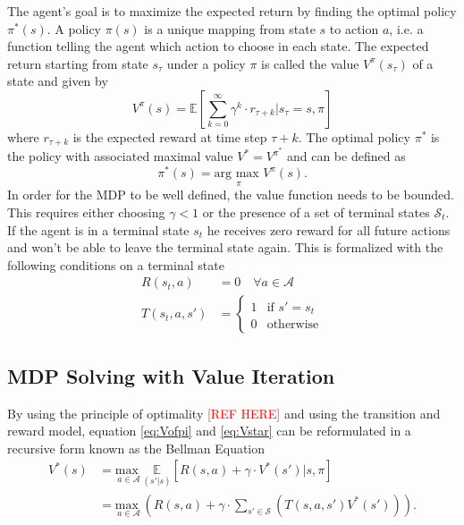 The agent's goal is to maximize the expected return by finding the optimal policy $\pi^*(s)$. A policy $\pi(s)$ is a unique mapping from state $s$ to action $a$, i.e. a function telling the agent which action to choose in each state. The expected return starting from state $s_\tau$ under a policy $\pi$ is called the value $V^\pi(s_\tau)$ of a state and given by 
\begin{equation}\label{eq:Vofpi}
    V^\pi(s) = \mathbb{E}\left[\sum_{k=0}^\infty \gamma^k\cdot r_{\tau+k}|s_\tau=s, \pi\right]
\end{equation}
where $r_{\tau+k}$ is the expected reward at time step $\tau+k$. 
The optimal policy $\pi^*$ is the policy with associated maximal value $V^*=V^{\pi^*}$ and can be defined as
\begin{equation}\label{eq:Vstar}
    \pi^*(s)=\underset{\pi}{\text{arg max }}V^\pi(s).
\end{equation}
In order for the MDP to be well defined, the value function needs to be bounded. This requires either choosing $\gamma<1$ or the presence of a set of terminal states $\mathcal{S}_t$. If the agent is in a terminal state $s_t$ he receives zero reward for all future actions and won't be able to leave the terminal state again. This is formalized with the following conditions on a terminal state
\begin{align}
    R(s_t, a) &= 0 \quad \forall a\in\mathcal{A}\\
    T(s_t, a, s') &=  \begin{cases}1 & \text{if }s'=s_t\\0 & \text{otherwise}\end{cases}
\end{align}

    




\subsection{MDP Solving with Value Iteration}\label{subsec:VALUEIT}

By using the principle of optimality \textcolor{red}{[REF HERE]} and using the transition and reward model, equation \ref{eq:Vofpi} and \ref{eq:Vstar} can be reformulated in a recursive form known as the Bellman Equation
\begin{align}\label{eq:BE}
    V^*(s) &= \underset{a\in\mathcal{A}}{\text{max }} \underset{(s'|s)}{\mathbb{E}}\left[R(s,a) + \gamma\cdot V^*(s')|s, \pi \right]\\
    &= \underset{a\in\mathcal{A}}{\text{max }} \left(R(s,a) + \gamma\cdot \sum_{s'\in\mathcal{S}}\left(T(s,a,s')V^*(s')\right)\right).
\end{align}

